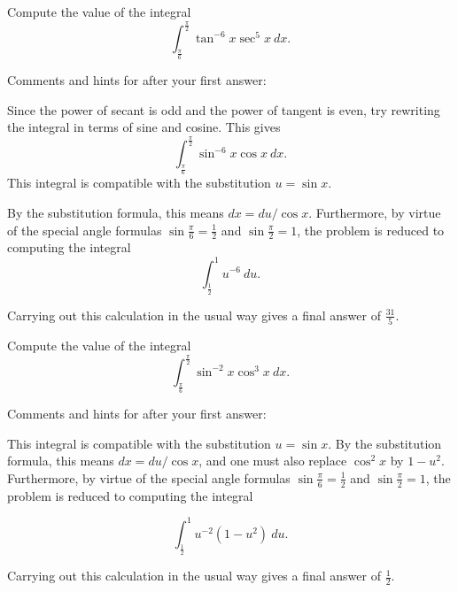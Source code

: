 \documentclass{ximera}
\begin{document}
\begin{question}%

Compute the value of the integral
\[\int_{\frac{\pi}{6}}^{\frac{\pi}{2}} \tan^{-6} x  \sec^{5} x ~dx.\]
\begin{multiplechoice}
\end{multiplechoice}
Comments and hints for after your first answer:
\begin{feedback}
Since the power of secant is odd and the power of tangent is even, try rewriting the integral in terms of sine and cosine. This gives 
\[\int_{\frac{\pi}{6}}^{\frac{\pi}{2}} \sin^{-6} x  \cos x ~dx.\]
This integral is compatible with the substitution \(u = \sin x\). \begin{hint} By the substitution formula, this means \(dx = du / \cos x\). Furthermore, by virtue of the special angle formulas \(\sin \frac{\pi}{6} = \frac{1}{2}\) and \(\sin \frac{\pi}{2} = 1\), the problem is reduced to computing the integral
\[\int_{\frac{1}{2}}^{1} u^{-6} ~du.\] \begin{hint}
Carrying out this calculation in the usual way gives a final answer of \(\frac{31}{5}\). \end{hint} \end{hint}
\end{feedback}

\end{question}

\begin{question}%

Compute the value of the integral
\[\int_{\frac{\pi}{6}}^{\frac{\pi}{2}} \sin^{-2} x  \cos^{3} x ~dx.\]
\begin{multiplechoice}
\end{multiplechoice}
Comments and hints for after your first answer:
\begin{feedback}
This integral is compatible with the substitution \(u = \sin x\). By the substitution formula, this means \(dx = du / \cos x\), and one must also replace \(\cos^2 x\) by \(1-u^2\). Furthermore, by virtue of the special angle formulas \(\sin \frac{\pi}{6} = \frac{1}{2}\) and \(\sin \frac{\pi}{2} = 1\), the problem is reduced to computing the integral \begin{hint}
\[\int_{\frac{1}{2}}^{1} u^{-2}(1-u^2) ~du.\] \begin{hint}
Carrying out this calculation in the usual way gives a final answer of \(\frac{1}{2}\). \end{hint} \end{hint}
\end{feedback}

\end{question}
\end{document}

